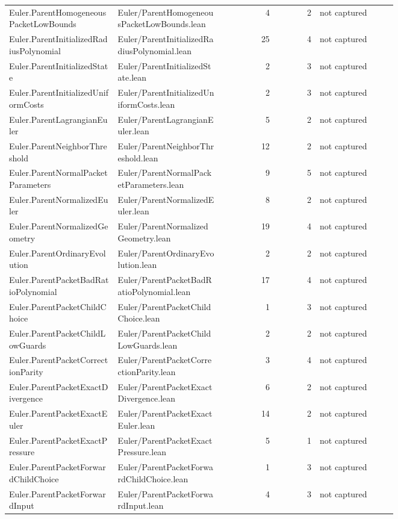 \documentclass[10pt]{article}
\begin{document}
\begin{longtable}{p{0.28\linewidth}p{0.27\linewidth}r r p{0.20\linewidth}}
Euler.ParentHomogeneousPacketLowBounds & Euler/ParentHomogeneousPacketLowBounds.lean & 4 & 2 & not captured\\
Euler.ParentInitializedRadiusPolynomial & Euler/ParentInitializedRadiusPolynomial.lean & 25 & 4 & not captured\\
Euler.ParentInitializedState & Euler/ParentInitializedState.lean & 2 & 3 & not captured\\
Euler.ParentInitializedUniformCosts & Euler/ParentInitializedUniformCosts.lean & 2 & 3 & not captured\\
Euler.ParentLagrangianEuler & Euler/ParentLagrangianEuler.lean & 5 & 2 & not captured\\
Euler.ParentNeighborThreshold & Euler/ParentNeighborThreshold.lean & 12 & 2 & not captured\\
Euler.ParentNormalPacketParameters & Euler/ParentNormalPacketParameters.lean & 9 & 5 & not captured\\
Euler.ParentNormalizedEuler & Euler/ParentNormalizedEuler.lean & 8 & 2 & not captured\\
Euler.ParentNormalizedGeometry & Euler/ParentNormalizedGeometry.lean & 19 & 4 & not captured\\
Euler.ParentOrdinaryEvolution & Euler/ParentOrdinaryEvolution.lean & 2 & 2 & not captured\\
Euler.ParentPacketBadRatioPolynomial & Euler/ParentPacketBadRatioPolynomial.lean & 17 & 4 & not captured\\
Euler.ParentPacketChildChoice & Euler/ParentPacketChildChoice.lean & 1 & 3 & not captured\\
Euler.ParentPacketChildLowGuards & Euler/ParentPacketChildLowGuards.lean & 2 & 2 & not captured\\
Euler.ParentPacketCorrectionParity & Euler/ParentPacketCorrectionParity.lean & 3 & 4 & not captured\\
Euler.ParentPacketExactDivergence & Euler/ParentPacketExactDivergence.lean & 6 & 2 & not captured\\
Euler.ParentPacketExactEuler & Euler/ParentPacketExactEuler.lean & 14 & 2 & not captured\\
Euler.ParentPacketExactPressure & Euler/ParentPacketExactPressure.lean & 5 & 1 & not captured\\
Euler.ParentPacketForwardChildChoice & Euler/ParentPacketForwardChildChoice.lean & 1 & 3 & not captured\\
Euler.ParentPacketForwardInput & Euler/ParentPacketForwardInput.lean & 4 & 3 & not captured\\

\end{longtable}
\end{document}
